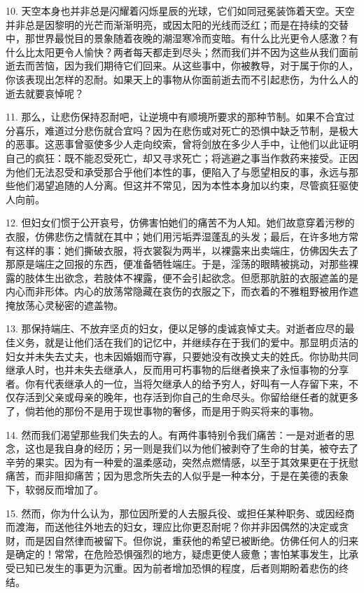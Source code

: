 10. 天空本身也并非总是闪耀着闪烁星辰的光球，它们如同冠冕装饰着天空。天空并非总是因黎明的光芒而渐渐明亮，或因太阳的光线而泛红；而是在持续的交替中，那世界最悦目的景象随着夜晚的潮湿寒冷而变暗。有什么比光更令人感激？有什么比太阳更令人愉快？两者每天都走到尽头；然而我们并不因为这些从我们面前逝去而苦恼，因为我们期待它们回来。从这些事中，你被教导，对于属于你的人，你该表现出怎样的忍耐。如果天上的事物从你面前逝去而不引起悲伤，为什么人的逝去就要哀悼呢？\par

11. 那么，让悲伤保持忍耐吧，让逆境中有顺境所要求的那种节制。如果不合宜过分喜乐，难道过分悲伤就合宜吗？因为在悲伤或对死亡的恐惧中缺乏节制，是极大的恶事。这恶事曾驱使多少人走向绞索，曾将剑放在多少人手中，让他们以此证明自己的疯狂：既不能忍受死亡，却又寻求死亡；将逃避之事当作救药来接受。正因为他们无法忍受和承受那合乎他们本性的事，便陷入了与愿望相反的事，永远与那些他们渴望追随的人分离。但这并不常见，因为本性本身加以约束，尽管疯狂驱使人向前。\par

12. 但妇女们惯于公开哀号，仿佛害怕她们的痛苦不为人知。她们故意穿着污秽的衣服，仿佛悲伤之情就在其中；她们用污垢弄湿蓬乱的头发；最后，在许多地方常有这样的事：她们撕破衣服，将衣裳裂为两半，以裸露来出卖端庄，仿佛因失去了那原是端庄之回报的东西，便准备牺牲端庄。于是，淫荡的眼睛被挑动，对那些裸露的肢体生出欲念，若肢体不裸露，便不会引起欲念。但愿那肮脏的衣服遮盖的是内心而非形体。内心的放荡常隐藏在哀伤的衣服之下，而衣着的不雅粗野被用作遮掩放荡心灵秘密的遮盖物。\par

13. 那保持端庄、不放弃坚贞的妇女，便以足够的虔诚哀悼丈夫。对逝者应尽的最佳义务，就是让他们活在我们的记忆中，并继续存在于我们的爱中。那显明贞洁的妇女并未失去丈夫，也未因婚姻而守寡，只要她没有改换丈夫的姓氏。你协助共同继承人时，也并未失去继承人，反而用可朽事物的后继者换来了永恒事物的分享者。你有代表继承人的一位，当将欠继承人的给予穷人，好叫有一人存留下来，不仅存活到父亲或母亲的晚年，也存活到你自己的生命尽头。你留给继任者的就更多了，倘若他的那份不是用于现世事物的奢侈，而是用于购买将来的事物。\par

14. 然而我们渴望那些我们失去的人。有两件事特别令我们痛苦：一是对逝者的思念，这也是我自身的经历；另一则是我们以为他们被剥夺了生命的甘美，被夺去了辛劳的果实。因为有一种爱的温柔感动，突然点燃情感，以至于其效果更在于抚慰痛苦，而非阻抑痛苦；因为思念所失去的人似乎是一种本分，于是在美德的表象下，软弱反而增加了。\par

15. 然而，你为什么认为，那位因所爱的人去服兵役、或担任某种职务、或因经商而渡海，而送他往外地去的妇女，理应比你更忍耐呢？你并非因偶然的决定或贪财，而是因自然律而被留下。但你说，重获他的希望已被断绝。仿佛任何人的归来是确定的！常常，在危险恐惧强烈的地方，疑虑更使人疲惫；害怕某事发生，比承受已知已发生的事更为沉重。因为前者增加恐惧的程度，后者则期盼着悲伤的终结。\par

